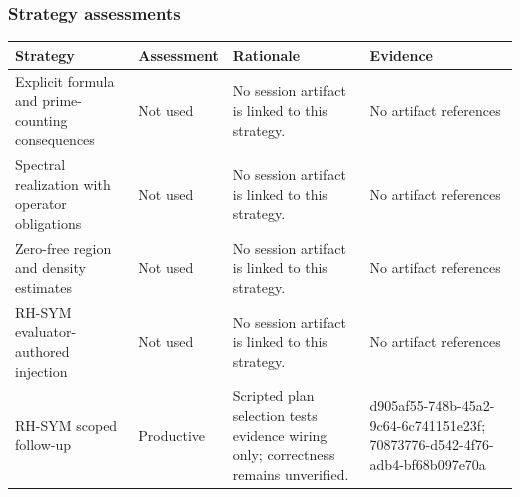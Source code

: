 \documentclass[11pt]{article}
\begin{document}
\subsubsection*{Strategy assessments}
\begin{longtable}{>{\raggedright\arraybackslash}p{.16\linewidth}>{\raggedright\arraybackslash}p{.15\linewidth}>{\raggedright\arraybackslash}p{.40\linewidth}>{\raggedright\arraybackslash}p{.17\linewidth}}
\toprule Strategy & Assessment & Rationale & Evidence \\
\midrule\endhead
Explicit formula and prime-counting consequences & Not used & No session artifact is linked to this strategy. & No artifact references \\
Spectral realization with operator obligations & Not used & No session artifact is linked to this strategy. & No artifact references \\
Zero-free region and density estimates & Not used & No session artifact is linked to this strategy. & No artifact references \\
RH-SYM evaluator-authored injection & Not used & No session artifact is linked to this strategy. & No artifact references \\
RH-SYM scoped follow-up & Productive & Scripted plan selection tests evidence wiring only; correctness remains unverified. & d905af55-748b-45a2-9c64-6c741151e23f; 70873776-d542-4f76-adb4-bf68b097e70a \\
\bottomrule
\end{longtable}
\end{document}
